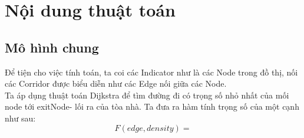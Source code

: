\section{Nội dung thuật toán}
    \subsection{Mô hình chung}
    Để tiện cho việc tính toán, ta coi các Indicator như là các Node 
    trong đồ thị, nối các Corridor được biểu diễn như các Edge nối giữa
    các Node. \\ 
    Ta áp dụng thuật toán Dijkstra để tìm đường đi có trọng số nhỏ nhất 
    của mối node tới exitNode- lối ra của tòa nhà. Ta đưa ra hàm tính 
    trọng số của một cạnh như sau: 
    \begin{equation}
        F(edge, density) =  
    \end{equation}


